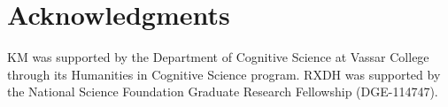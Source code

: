 \documentclass[10pt,letterpaper]{article}
\newcommand{\kushin}[1]{{\color{orange}{[kushin: #1]}}}
\begin{document}




 
 \section{Acknowledgments}
KM was supported by the Department of Cognitive Science at Vassar College through its Humanities in Cognitive Science program.
RXDH was supported by the National Science Foundation Graduate Research Fellowship (DGE-114747). 




\end{document}

